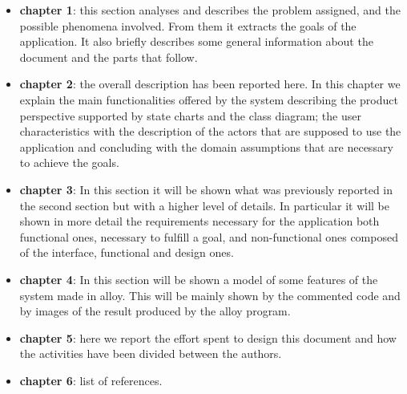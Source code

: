 \begin{itemize}
	\item \textbf{chapter 1}: this section analyses and describes the problem assigned, and the possible phenomena involved. From them it extracts the goals of the application. It also briefly describes some general information about the document and the parts that follow.
	\item \textbf{chapter 2}: the overall description has been reported here. In this chapter we explain the main functionalities offered by the system describing the product perspective supported by state charts and the class diagram; the user characteristics with the description of the actors that are supposed to use the application and concluding with the domain assumptions that are necessary to achieve the goals.
	\item \textbf{chapter 3}: In this section it will be shown what was previously reported in the second section but with a higher level of details. In particular it will be shown in more detail the requirements necessary for the application both functional ones, necessary to fulfill a goal, and non-functional ones composed of the interface, functional and design ones.
	\item \textbf{chapter 4}: In this section will be shown a model of some features of the system made in alloy. This will be mainly shown by the commented code and by images of the result produced by the alloy program.
	\item \textbf{chapter 5}: here we report the effort spent to design this document and how the activities have been divided between the authors.
	\item \textbf{chapter 6}: list of references.
\end{itemize}